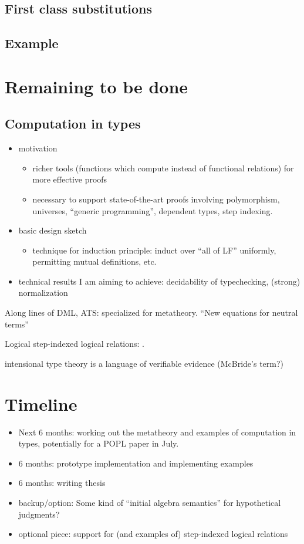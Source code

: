 \documentclass{article}
\begin{document}
\subsection{First class substitutions}

\subsection{Example}
\section{Remaining to be done}
\subsection{Computation in types}
\begin{itemize}
\item motivation
\begin{itemize}
\item richer tools (functions which compute instead of functional
relations) for more effective proofs
\item necessary to support state-of-the-art proofs involving polymorphism,
universes, ``generic programming'', dependent types, step indexing.
\end{itemize}
\item basic design sketch
\begin{itemize}
\item technique for induction principle: induct over ``all of LF'' uniformly, permitting mutual definitions, etc.
\end{itemize}
\item technical results I am aiming to achieve: decidability
  of typechecking, (strong) normalization
\end{itemize}

Along lines of DML, ATS: specialized for metatheory. ``New equations for neutral terms'' \cite{Allais13}

Logical step-indexed logical relations: \cite{Dreyer11}.

intensional type theory is a language of verifiable evidence (McBride's term?)
\section{Timeline}
\begin{itemize}
\item Next 6 months: working out the metatheory and examples of computation in
types, potentially for a POPL paper in July.
\item 6 months: prototype implementation and implementing examples
\item 6 months: writing thesis
\item backup/option: Some kind of ``initial algebra semantics'' for hypothetical judgments?
\item optional piece: support for (and examples of) step-indexed
  logical relations
\end{itemize}



\end{document}
